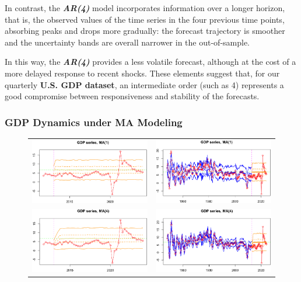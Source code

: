\documentclass{Configuration_Files/PoliMi3i_thesis}
\begin{document}
In contrast, the \textbf{\textit{AR(4)}} model incorporates information over a longer horizon, that is, the observed values of the time series in the four previous time points, absorbing peaks and drops more gradually: the forecast trajectory is smoother and the uncertainty bands are overall narrower in the out-of-sample. 

In this way, the \textbf{\textit{AR(4)}} provides a less volatile forecast, although at the cost of a more delayed response to recent shocks. These elements suggest that, for our quarterly \textbf{U.S. GDP dataset}, an intermediate order (such as 4) represents a good compromise between responsiveness and stability of the forecasts.



\subsubsection{GDP Dynamics under MA Modeling}


\begin{figure}[H]
  \centering
  \begin{tabular}{@{}cc@{}}
    \includegraphics[angle=270,width=0.33\linewidth]{MA(1)z.png} &
    \includegraphics[angle=270,width=0.33\linewidth]{MA(1)f.png} \\
    \includegraphics[angle=270,width=0.33\linewidth]{MA(4)z.png} &
    \includegraphics[angle=270,width=0.33\linewidth]{MA(4)f.png}
  \end{tabular}
\end{figure}
\end{document}
